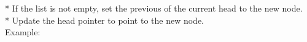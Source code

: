 \documentclass[preview]{standalone}
\begin{document}
*   If the list is not empty, set the previous of the current head to the new node.\\*   Update the head pointer to point to the new node.\\Example:\\
\end{document}
